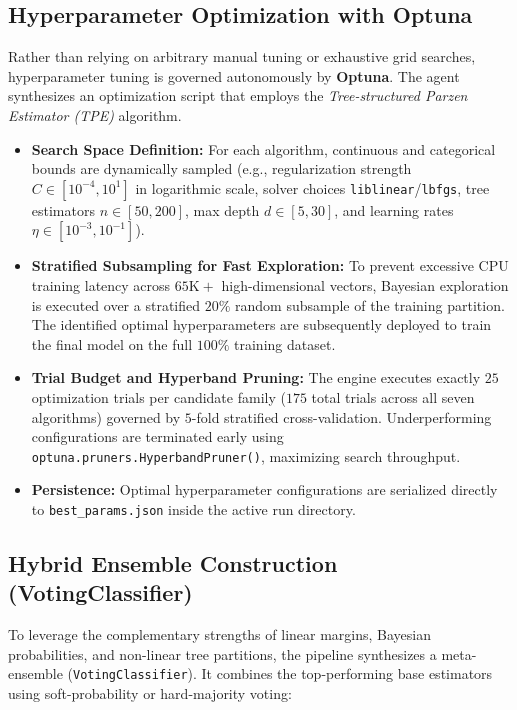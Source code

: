 \documentclass[conference]{IEEEtran}
\begin{document}
\subsection{Hyperparameter Optimization with Optuna}
Rather than relying on arbitrary manual tuning or exhaustive grid searches, hyperparameter tuning is governed autonomously by \textbf{Optuna}. The agent synthesizes an optimization script that employs the \textit{Tree-structured Parzen Estimator (TPE)} algorithm.

\begin{itemize}
    \item \textbf{Search Space Definition:} For each algorithm, continuous and categorical bounds are dynamically sampled (e.g., regularization strength $C \in [10^{-4}, 10^1]$ in logarithmic scale, solver choices \texttt{liblinear}/\texttt{lbfgs}, tree estimators $n \in [50, 200]$, max depth $d \in [5, 30]$, and learning rates $\eta \in [10^{-3}, 10^{-1}]$).
    \item \textbf{Stratified Subsampling for Fast Exploration:} To prevent excessive CPU training latency across $65\text{K}+$ high-dimensional vectors, Bayesian exploration is executed over a stratified $20\%$ random subsample of the training partition. The identified optimal hyperparameters are subsequently deployed to train the final model on the full $100\%$ training dataset.
    \item \textbf{Trial Budget and Hyperband Pruning:} The engine executes exactly $25$ optimization trials per candidate family ($175$ total trials across all seven algorithms) governed by $5$-fold stratified cross-validation. Underperforming configurations are terminated early using \texttt{optuna.pruners.HyperbandPruner()}, maximizing search throughput.
    \item \textbf{Persistence:} Optimal hyperparameter configurations are serialized directly to \texttt{best\_params.json} inside the active run directory.
\end{itemize}

\subsection{Hybrid Ensemble Construction (VotingClassifier)}
To leverage the complementary strengths of linear margins, Bayesian probabilities, and non-linear tree partitions, the pipeline synthesizes a meta-ensemble (\texttt{VotingClassifier}). It combines the top-performing base estimators using soft-probability or hard-majority voting:
\end{document}
